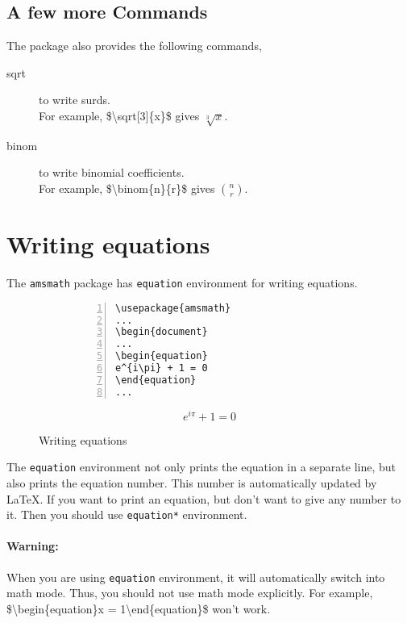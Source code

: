 \documentclass{article}
\begin{document}
\subsection{A few more Commands}
The  package also provides the following commands,
\begin{description}
	\item[sqrt] to write surds.\\
	For example, \$\textbackslash sqrt[3]\{x\}\$ gives $\sqrt[3]{x}$.
	\item[binom] to write binomial coefficients.\\
	For example, \$\textbackslash binom\{n\}\{r\}\$ gives $\binom{n}{r}$.
\end{description}

\section{Writing equations}
	The \texttt{amsmath} package has \texttt{equation} environment for writing equations.
\begin{figure}[h]
\centering
\begin{subfigure}{0.45\textwidth}
\begin{Verbatim}[numbers = left]
\usepackage{amsmath}
...
\begin{document}
...
\begin{equation}
e^{i\pi} + 1 = 0
\end{equation}
...
\end{Verbatim}
\end{subfigure}
\begin{subfigure}{0.45\textwidth}
\begin{equation}
e^{i\pi} + 1 = 0
\end{equation}
\end{subfigure}
\caption{Writing equations}
\label{fig:equation}
\end{figure}

	The \texttt{equation} environment not only prints the equation in a separate line, but also prints the equation number. This number is automatically updated by \LaTeX{}. If you want to print an equation, but don't want to give any number to it. Then you should use \texttt{equation*} environment.
	
\paragraph{Warning:}
	When you are using \texttt{equation} environment, it will automatically switch into math mode. Thus, you should not use math mode explicitly. For example, \$\textbackslash begin\{equation\}x = 1\textbackslash end\{equation\}\$ won't work.
\end{document}
